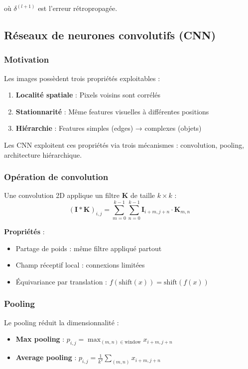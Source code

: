 où $\delta^{(l+1)}$ est l'erreur rétropropagée.

\subsection{Réseaux de neurones convolutifs (CNN)}

\subsubsection{Motivation}

Les images possèdent trois propriétés exploitables :
\begin{enumerate}
    \item \textbf{Localité spatiale} : Pixels voisins sont corrélés
    \item \textbf{Stationnarité} : Même features visuelles à différentes positions
    \item \textbf{Hiérarchie} : Features simples (edges) → complexes (objets)
\end{enumerate}

Les CNN exploitent ces propriétés via trois mécanismes : convolution, pooling, architecture hiérarchique.

\subsubsection{Opération de convolution}

Une convolution 2D applique un filtre $\mathbf{K}$ de taille $k \times k$ :
\[
(\mathbf{I} * \mathbf{K})_{i,j} = \sum_{m=0}^{k-1} \sum_{n=0}^{k-1} \mathbf{I}_{i+m, j+n} \cdot \mathbf{K}_{m,n}
\]

\textbf{Propriétés} :
\begin{itemize}
    \item Partage de poids : même filtre appliqué partout
    \item Champ réceptif local : connexions limitées
    \item Équivariance par translation : $f(\text{shift}(x)) = \text{shift}(f(x))$
\end{itemize}

\subsubsection{Pooling}

Le pooling réduit la dimensionnalité :
\begin{itemize}
    \item \textbf{Max pooling} : $p_{i,j} = \max_{(m,n) \in \text{window}} x_{i+m, j+n}$
    \item \textbf{Average pooling} : $p_{i,j} = \frac{1}{k^2}\sum_{(m,n)} x_{i+m, j+n}$
\end{itemize}

